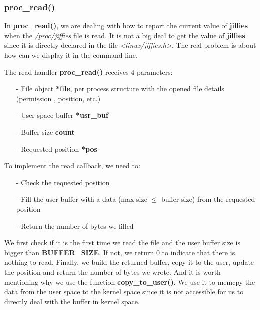 \documentclass{article}
\begin{document}
    \vspace{2pt}

    \subsubsection*{proc\_read()}
    In \textbf{proc\_read()}, we are dealing with how to report the current value of \textbf{jiffies} when the \textit{/proc/jiffies} file is read. It is not a big deal to get the value of \textbf{jiffies} since it is directly declared in the file \textit{<linux/jiffies.h>}. The real problem is about how can we display it in the command line. 

    The read handler \textbf{proc\_read()} receives 4 parameters:

    \begin{enumerate}
        \item[-] File object \textbf{*file}, per process structure with the opened file details (permission , position, etc.)
        \item[-] User space buffer \textbf{*usr\_buf}
        \item[-] Buffer size \textbf{count}
        \item[-] Requested position \textbf{*pos}
    \end{enumerate}

    To implement the read callback, we need to:

    \begin{enumerate}
        \item[-] Check the requested position
        \item[-] Fill the user buffer with a data (max size $\leq$ buffer size) from the requested position
        \item[-] Return the number of bytes we filled
    \end{enumerate}

    We first check if it is the first time we read the file and the user buffer size is bigger than \textbf{BUFFER\_SIZE}. If not, we return 0 to indicate that there is nothing to read. Finally, we build the returned buffer, copy it to the user, update the position and return the number of bytes we wrote. And it is worth mentioning why we use the function \textbf{copy\_to\_user()}. We use it to memcpy the data from the user space to the kernel space since it is not accessible for us to directly deal with the buffer in kernel space. 

    \vspace{2pt}
\end{document}
